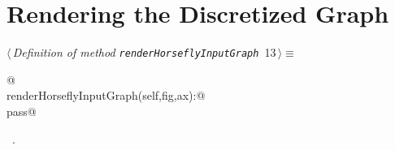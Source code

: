 \documentclass[11.5pt]{report}
\begin{document}
\section{Rendering the Discretized Graph}

\begin{flushleft} \small
\begin{minipage}{\linewidth}\label{scrap12}\raggedright\small
{} $\langle\,${\itshape Definition of method \verb|renderHorseflyInputGraph|}\nobreak\ {\footnotesize {13}}$\,\rangle\equiv$
\vspace{-1ex}
\begin{list}{}{} \item
\mbox{}\verb@   @\\
\mbox{}\verb@def renderHorseflyInputGraph(self,fig,ax):@\\
\mbox{}\verb@    pass@\\
\mbox{}\verb@@{\NWsep}
\end{list}
\vspace{-1.5ex}
\footnotesize
\begin{list}{}{\setlength{\itemsep}{-\parsep}\setlength{\itemindent}{-\leftmargin}}
\item \NWtxtMacroRefIn\ .

\item{}
\end{list}
\end{minipage}\vspace{4ex}
\end{flushleft}
\end{document}
